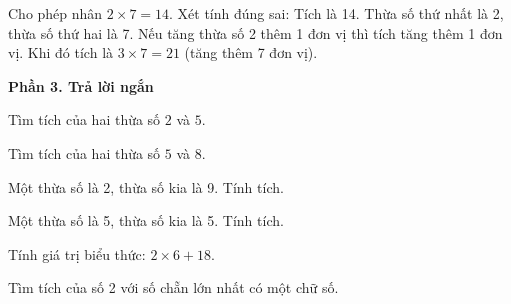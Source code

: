 \begin{ex} %
Cho phép nhân $2 \times 7 = 14$. Xét tính đúng sai:
\choiceTF
{\True Tích là 14.}
{\True Thừa số thứ nhất là 2, thừa số thứ hai là 7.}
{Nếu tăng thừa số 2 thêm 1 đơn vị thì tích tăng thêm 1 đơn vị.}
{\True Khi đó tích là $3 \times 7 = 21$ (tăng thêm 7 đơn vị).}
\end{ex}

\textbf{Phần 3. Trả lời ngắn}

\begin{ex} %
Tìm tích của hai thừa số $2$ và $5$.
\end{ex}

\begin{ex} %
Tìm tích của hai thừa số $5$ và $8$.
\end{ex}

\begin{ex} %
Một thừa số là 2, thừa số kia là 9. Tính tích.
\end{ex}

\begin{ex} %
Một thừa số là 5, thừa số kia là 5. Tính tích.
\end{ex}

\begin{ex} %
Tính giá trị biểu thức: $2 \times 6 + 18$.
\end{ex}

\begin{ex} %
Tìm tích của số 2 với số chẵn lớn nhất có một chữ số.
\end{ex}
